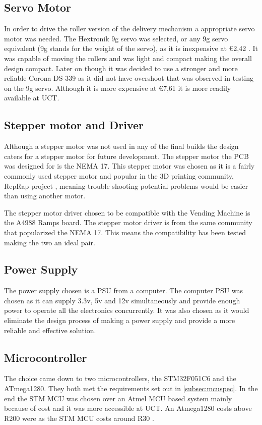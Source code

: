 \documentclass[a4paper,11pt]{article}
\newcommand*{\halfref}[1]{\hyperref[{#1}]{\autoref*{#1}}}
\numberwithin{figure}{section}
\numberwithin{table}{section}
\begin{document}
\subsection{Servo Motor}
In order to drive the roller version of the delivery mechanism a appropriate servo motor was needed. The Hextronik 9g servo was selected, or any 9g servo equivalent (9g stands for the weight of the servo), as it is inexpensive at \euro 2,42 \cite{hobbyking}. It was capable of moving the rollers and was light and compact making the overall design compact. Later on though it was decided to use a stronger and more reliable Corona DS-339 as it did not have overshoot that was observed in testing on the 9g servo. Although it is more expensive at \euro 7,61 \cite{hobbyking} it is more readily available at UCT.

\subsection{Stepper motor and Driver}
Although a stepper motor was not used in any of the final builds the design caters for a stepper motor for future development. The stepper motor the PCB was designed for is the NEMA 17. This stepper motor was chosen as it is a fairly commonly used stepper motor and popular in the 3D printing community, RepRap project \cite{reprap}, meaning trouble shooting potential problems would be easier than using another motor.

The stepper motor driver chosen to be compatible with the Vending Machine is the A4988 Ramps board. The stepper motor driver is from the same community that popularized the NEMA 17. This means the compatibility has been tested making the two an ideal pair.

\subsection{Power Supply}
The power supply chosen is a PSU from a computer. The computer PSU was chosen as it can supply 3.3v, 5v and 12v simultaneously and provide enough power to operate all the electronics concurrently. It was also chosen as it would eliminate the design process of making a power supply and provide a more reliable and effective solution.

\subsection{Microcontroller}
The choice came down to two microcontrollers, the STM32F051C6 and the ATmega1280. They both met the requirements set out in \halfref{subsec:mcuspec}.
In the end the STM MCU was chosen over an Atmel MCU based system mainly because of cost and it was more accessible at UCT. An Atmega1280 costs above R200 were as the STM MCU costs around R30 \cite{rsonline}. 
\end{document}
